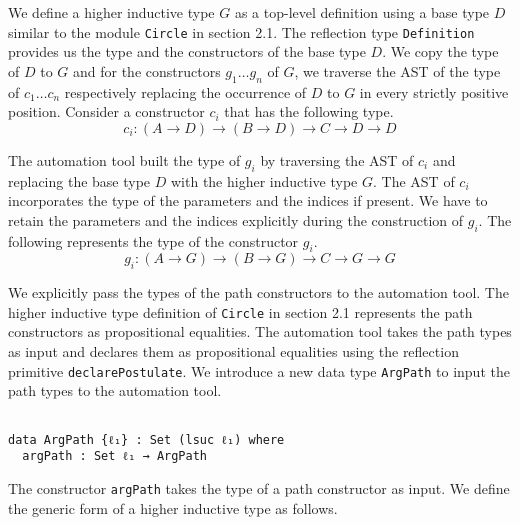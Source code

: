 \documentclass[sigplan,10pt]{acmart}
\begin{document}
We define a higher inductive type $G$ as a top-level definition using a base type $D$ similar to the module {\tt Circle} in section 2.1. The reflection type {\tt Definition} provides us the type and the constructors of the base type $D$. We copy the type of $D$ to $G$ and for the constructors $g_1 \ldots g_n$ of $G$, we traverse the AST of the type of $c_1 \ldots c_n$ respectively replacing the occurrence of $D$ to $G$ in every strictly positive position. Consider a constructor $c_i$ that has the following type.
\begin{equation}
c_i : (A \rightarrow D) \rightarrow (B \rightarrow D) \rightarrow C \rightarrow D \rightarrow D \nonumber
\end{equation}

The automation tool built the type of $g_i$ by traversing the AST of $c_i$ and replacing the base type $D$ with the higher inductive type $G$. The AST of $c_i$ incorporates the type of the parameters and the indices if present. We have to retain the parameters and the indices explicitly during the construction of $g_i$. The following represents the type of the constructor $g_i$.
\begin{equation}
g_i : (A \rightarrow G) \rightarrow (B \rightarrow G) \rightarrow C \rightarrow G \rightarrow G \nonumber
\end{equation}

We explicitly pass the types of the path constructors to the automation tool. The higher inductive type definition of {\tt Circle} in section 2.1 represents the path constructors as propositional equalities. The automation tool takes the path types as input and declares them as propositional equalities using the reflection primitive {\tt declarePostulate}. We introduce a new data type {\tt ArgPath} to input the path types to the automation tool.

\begin{center}
\begingroup
\begin{BVerbatim}

data ArgPath {ℓ₁} : Set (lsuc ℓ₁) where
  argPath : Set ℓ₁ → ArgPath
\end{BVerbatim}
\endgroup
\end{center}

The constructor {\tt argPath} takes the type of a path constructor as input. We define the generic form of a higher inductive type as follows.
\end{document}
